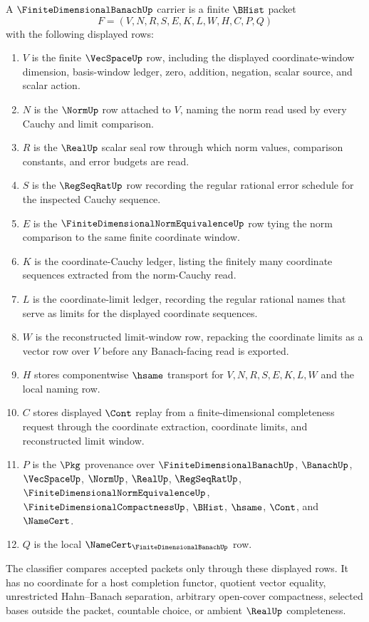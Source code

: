 \begin{definition}
\label{def:finite-dimensional-banach-carrier}
A $\FiniteDimensionalBanachUp$ carrier is a finite $\BHist$ packet
$$
F=(V,N,R,S,E,K,L,W,H,C,P,Q)
$$
with the following displayed rows:
\begin{enumerate}
\item $V$ is the finite $\VecSpaceUp$ row, including the displayed coordinate-window dimension, basis-window ledger, zero, addition, negation, scalar source, and scalar action.
\item $N$ is the $\NormUp$ row attached to $V$, naming the norm read used by every Cauchy and limit comparison.
\item $R$ is the $\RealUp$ scalar seal row through which norm values, comparison constants, and error budgets are read.
\item $S$ is the $\RegSeqRatUp$ row recording the regular rational error schedule for the inspected Cauchy sequence.
\item $E$ is the $\FiniteDimensionalNormEquivalenceUp$ row tying the norm comparison to the same finite coordinate window.
\item $K$ is the coordinate-Cauchy ledger, listing the finitely many coordinate sequences extracted from the norm-Cauchy read.
\item $L$ is the coordinate-limit ledger, recording the regular rational names that serve as limits for the displayed coordinate sequences.
\item $W$ is the reconstructed limit-window row, repacking the coordinate limits as a vector row over $V$ before any Banach-facing read is exported.
\item $H$ stores componentwise $\hsame$ transport for $V,N,R,S,E,K,L,W$ and the local naming row.
\item $C$ stores displayed $\Cont$ replay from a finite-dimensional completeness request through the coordinate extraction, coordinate limits, and reconstructed limit window.
\item $P$ is the $\Pkg$ provenance over $\FiniteDimensionalBanachUp$, $\BanachUp$, $\VecSpaceUp$, $\NormUp$, $\RealUp$, $\RegSeqRatUp$, $\FiniteDimensionalNormEquivalenceUp$, $\FiniteDimensionalCompactnessUp$, $\BHist$, $\hsame$, $\Cont$, and $\NameCert$.
\item $Q$ is the local $\NameCert_{\FiniteDimensionalBanachUp}$ row.
\end{enumerate}
The classifier compares accepted packets only through these displayed rows. It has no coordinate for a host completion functor, quotient vector equality, unrestricted Hahn--Banach separation, arbitrary open-cover compactness, selected bases outside the packet, countable choice, or ambient $\RealUp$ completeness.
\end{definition}

